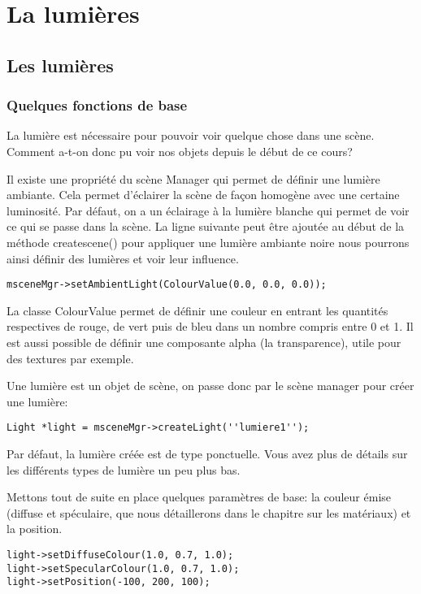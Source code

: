 

\chapter{La lumières}



\section{Les lumières}


\subsection{Quelques fonctions de base}

La lumière est nécessaire pour pouvoir voir quelque chose dans une scène. Comment a-t-on donc pu voir nos objets depuis le début de ce cours?

Il existe une propriété du scène Manager qui permet de définir une lumière ambiante. Cela permet d'éclairer la scène de façon homogène avec une certaine luminosité. Par défaut, on a un éclairage à la lumière blanche qui permet de voir ce qui se passe dans la scène. La ligne suivante peut être ajoutée au début de la méthode createscene() pour appliquer une lumière ambiante noire nous pourrons ainsi définir des lumières et voir leur influence.

\begin{lstlisting}
msceneMgr->setAmbientLight(ColourValue(0.0, 0.0, 0.0));
\end{lstlisting}



La classe ColourValue permet de définir une couleur en entrant les quantités respectives de rouge, de vert puis de bleu dans un nombre compris entre 0 et 1. Il est aussi possible de définir une composante alpha (la transparence), utile pour des textures par exemple.

Une lumière est un objet de scène, on passe donc par le scène manager pour créer une lumière:
\begin{lstlisting}
Light *light = msceneMgr->createLight(''lumiere1'');
\end{lstlisting}

Par défaut, la lumière créée est de type ponctuelle. Vous avez plus de détails sur les différents types de lumière un peu plus bas.

Mettons tout de suite en place quelques paramètres de base: la couleur émise (diffuse et spéculaire, que nous détaillerons dans le chapitre sur les matériaux) et la position.
\begin{lstlisting}
light->setDiffuseColour(1.0, 0.7, 1.0);
light->setSpecularColour(1.0, 0.7, 1.0);
light->setPosition(-100, 200, 100);
\end{lstlisting}




